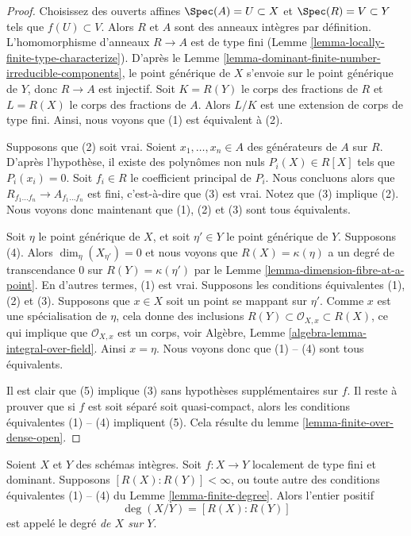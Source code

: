 \begin{proof}
Choisissez des ouverts affines $\Spec(A) = U \subset X$ et $\Spec(R) = V \subset Y$
tels que $f(U) \subset V$. Alors $R$ et $A$
sont des anneaux intègres par définition. L'homomorphisme
d'anneaux $R \to A$ est
de type fini (Lemme \ref{lemma-locally-finite-type-characterize}). D'après le Lemme \ref{lemma-dominant-finite-number-irreducible-components},
le point générique de $X$ s'envoie sur le point générique
de $Y$, donc $R \to A$ est injectif. Soit
$K = R(Y)$ le corps des fractions de $R$ et $L = R(X)$ le
corps des fractions de $A$. Alors $L/K$ est une
extension de corps de type fini. Ainsi, nous voyons que (1)
est équivalent à (2).

\medskip\noindent
Supposons que (2) soit vrai. Soient $x_1, \ldots, x_n \in A$ des générateurs de
$A$ sur $R$. D'après l'hypothèse, il existe des polynômes
non nuls $P_i(X) \in R[X]$ tels que $P_i(x_i) = 0$. Soit $f_i \in R$ le coefficient
principal de $P_i$. Nous concluons alors
que $R_{f_1 \ldots f_n} \to A_{f_1 \ldots f_n}$ est fini, c'est-à-dire que (3) est vrai. Notez que (3) implique
(2). Nous voyons donc maintenant que (1), (2) et (3) sont tous
équivalents.

\medskip\noindent
Soit $\eta$ le point générique de $X$, et soit $\eta' \in Y$
le point générique de $Y$.
Supposons (4). Alors $\dim_\eta(X_{\eta'}) = 0$ et nous voyons que $R(X) = \kappa(\eta)$
a un degré de transcendance $0$ sur $R(Y) = \kappa(\eta')$
par le Lemme \ref{lemma-dimension-fibre-at-a-point}. En d'autres
termes, (1) est vrai. Supposons les conditions équivalentes (1),
(2) et (3). Supposons que $x \in X$ soit un point se
mappant sur $\eta'$. Comme $x$
est une spécialisation de $\eta$, cela donne des inclusions
$R(Y) \subset \mathcal{O}_{X, x} \subset R(X)$, ce qui implique que $\mathcal{O}_{X, x}$
est un corps, voir Algèbre, Lemme \ref{algebra-lemma-integral-over-field}.
Ainsi $x = \eta$. Nous voyons donc que (1) -- (4) sont
tous équivalents.

\medskip\noindent
Il est clair que (5) implique (3) sans hypothèses supplémentaires
sur $f$. Il reste à prouver que si $f$ est soit
séparé soit quasi-compact, alors les conditions équivalentes (1)
-- (4) impliquent (5). Cela résulte du lemme \ref{lemma-finite-over-dense-open}.
\end{proof}

\begin{definition}
\label{definition-degree}
Soient $X$ et $Y$ des
schémas intègres. Soit $f : X \to Y$ localement de type
fini et dominant. Supposons $[R(X) : R(Y)] < \infty$, ou toute autre des conditions
équivalentes (1) -- (4) du Lemme \ref{lemma-finite-degree}.
Alors l'entier positif
$$
\deg(X/Y) = [R(X) : R(Y)]
$$
est appelé le degré {\it de $X$ sur $Y$}.
\end{definition}

